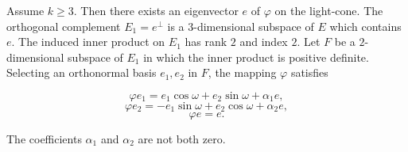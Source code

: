 Assume $k \geq 3$. Then there exists an eigenvector $e$ of $\varphi$ on the light-cone. The orthogonal complement $E_1 = e^\perp$ is a $3$-dimensional subspace of $E$ which contains $e$. The induced inner product on $E_1$ has rank $2$ and index $2$. Let $F$ be a $2$-dimensional subspace of $E_1$ in which the inner product is positive definite. Selecting an orthonormal basis $e_1, e_2$ in $F$, the mapping $\varphi$ satisfies

$$\varphi e_1 = e_1 \cos \omega + e_2 \sin \omega + \alpha_1 e,$$
$$\varphi e_2 = -e_1 \sin \omega + e_2 \cos \omega + \alpha_2 e,$$
$$\varphi e = e.$$

The coefficients $\alpha_1$ and $\alpha_2$ are not both zero.
